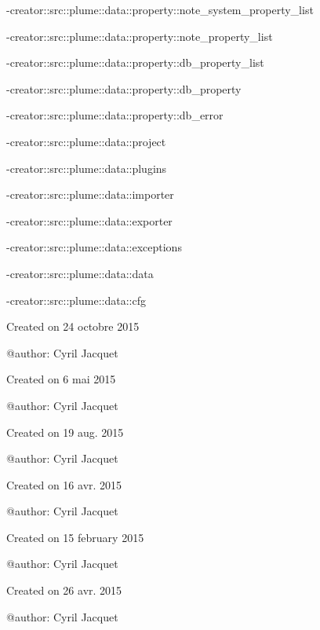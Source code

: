 -\/creator\+::src\+::plume\+::data\+::property\+::note\+\_\+system\+\_\+property\+\_\+list

-\/creator\+::src\+::plume\+::data\+::property\+::note\+\_\+property\+\_\+list

-\/creator\+::src\+::plume\+::data\+::property\+::db\+\_\+property\+\_\+list

-\/creator\+::src\+::plume\+::data\+::property\+::db\+\_\+property

-\/creator\+::src\+::plume\+::data\+::property\+::db\+\_\+error

-\/creator\+::src\+::plume\+::data\+::project

-\/creator\+::src\+::plume\+::data\+::plugins

-\/creator\+::src\+::plume\+::data\+::importer

-\/creator\+::src\+::plume\+::data\+::exporter

-\/creator\+::src\+::plume\+::data\+::exceptions

-\/creator\+::src\+::plume\+::data\+::data

-\/creator\+::src\+::plume\+::data\+::cfg

\begin{DoxyVerb}Created on 24 octobre 2015

@author:  Cyril Jacquet
\end{DoxyVerb}


\begin{DoxyVerb}Created on 6 mai 2015

@author:  Cyril Jacquet
\end{DoxyVerb}


\begin{DoxyVerb}Created on 19 aug. 2015

@author: Cyril Jacquet
\end{DoxyVerb}


\begin{DoxyVerb}Created on 16 avr. 2015

@author: Cyril Jacquet
\end{DoxyVerb}


\begin{DoxyVerb}Created on 15 february 2015

@author:  Cyril Jacquet
\end{DoxyVerb}


\begin{DoxyVerb}Created on 26 avr. 2015

@author:  Cyril Jacquet
\end{DoxyVerb}



